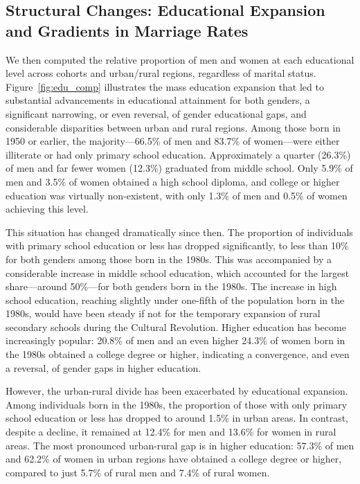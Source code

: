 \subsection{Structural Changes: Educational Expansion and Gradients in Marriage Rates}

We then computed the relative proportion of men and women at each educational level across cohorts and urban/rural regions, regardless of marital status. Figure~\ref{fig:edu_comp} illustrates the mass education expansion that led to substantial advancements in educational attainment for both genders, a significant narrowing, or even reversal, of gender educational gaps, and considerable disparities between urban and rural regions. Among those born in 1950 or earlier, the majority—66.5\% of men and 83.7\% of women—were either illiterate or had only primary school education. Approximately a quarter (26.3\%) of men and far fewer women (12.3\%) graduated from middle school. Only 5.9\% of men and 3.5\% of women obtained a high school diploma, and college or higher education was virtually non-existent, with only 1.3\% of men and 0.5\% of women achieving this level.

This situation has changed dramatically since then. The proportion of individuals with primary school education or less has dropped significantly, to less than 10\% for both genders among those born in the 1980s. This was accompanied by a considerable increase in middle school education, which accounted for the largest share—around 50\%—for both genders born in the 1980s. The increase in high school education, reaching slightly under one-fifth of the population born in the 1980s, would have been steady if not for the temporary expansion of rural secondary schools during the Cultural Revolution. Higher education has become increasingly popular: 20.8\% of men and an even higher 24.3\% of women born in the 1980s obtained a college degree or higher, indicating a convergence, and even a reversal, of gender gaps in higher education.

However, the urban-rural divide has been exacerbated by educational expansion. Among individuals born in the 1980s, the proportion of those with only primary school education or less has dropped to around 1.5\% in urban areas. In contrast, despite a decline, it remained at 12.4\% for men and 13.6\% for women in rural areas. The most pronounced urban-rural gap is in higher education: 57.3\% of men and 62.2\% of women in urban regions have obtained a college degree or higher, compared to just 5.7\% of rural men and 7.4\% of rural women.


